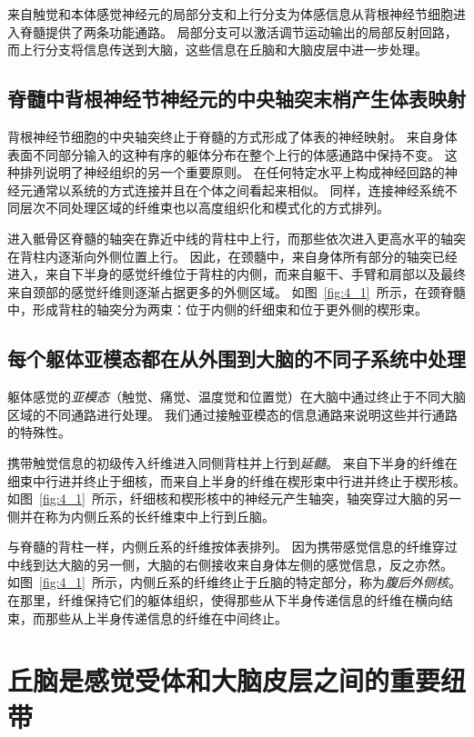 来自触觉和本体感觉神经元的局部分支和上行分支为体感信息从背根神经节细胞进入脊髓提供了两条功能通路。
局部分支可以激活调节运动输出的局部反射回路，而上行分支将信息传送到大脑，这些信息在丘脑和大脑皮层中进一步处理。



\subsection{脊髓中背根神经节神经元的中央轴突末梢产生体表映射}

背根神经节细胞的中央轴突终止于脊髓的方式形成了体表的神经映射。
来自身体表面不同部分输入的这种有序的躯体分布在整个上行的体感通路中保持不变。
这种排列说明了神经组织的另一个重要原则。
在任何特定水平上构成神经回路的神经元通常以系统的方式连接并且在个体之间看起来相似。 
同样，连接神经系统不同层次不同处理区域的纤维束也以高度组织化和模式化的方式排列。


进入骶骨区脊髓的轴突在靠近中线的背柱中上行，而那些依次进入更高水平的轴突在背柱内逐渐向外侧位置上行。 
因此，在颈髓中，来自身体所有部分的轴突已经进入，来自下半身的感觉纤维位于背柱的内侧，而来自躯干、手臂和肩部以及最终来自颈部的感觉纤维则逐渐占据更多的外侧区域。
如图~\ref{fig:4_1}~所示，在颈脊髓中，形成背柱的轴突分为两束：位于内侧的纤细束和位于更外侧的楔形束。



\subsection{每个躯体亚模态都在从外围到大脑的不同子系统中处理}

躯体感觉的\textit{亚模态}（触觉、痛觉、温度觉和位置觉）在大脑中通过终止于不同大脑区域的不同通路进行处理。
我们通过接触亚模态的信息通路来说明这些并行通路的特殊性。


携带触觉信息的初级传入纤维进入同侧背柱并上行到\textit{延髓}。
来自下半身的纤维在细束中行进并终止于细核，而来自上半身的纤维在楔形束中行进并终止于楔形核。
如图~\ref{fig:4_1}~所示，纤细核和楔形核中的神经元产生轴突，轴突穿过大脑的另一侧并在称为内侧丘系的长纤维束中上行到丘脑。


与脊髓的背柱一样，内侧丘系的纤维按体表排列。
因为携带感觉信息的纤维穿过中线到达大脑的另一侧，大脑的右侧接收来自身体左侧的感觉信息，反之亦然。
如图~\ref{fig:4_1}~所示，内侧丘系的纤维终止于丘脑的特定部分，称为\textit{腹后外侧核}。
在那里，纤维保持它们的躯体组织，使得那些从下半身传递信息的纤维在横向结束，而那些从上半身传递信息的纤维在中间终止。



\section{丘脑是感觉受体和大脑皮层之间的重要纽带}

